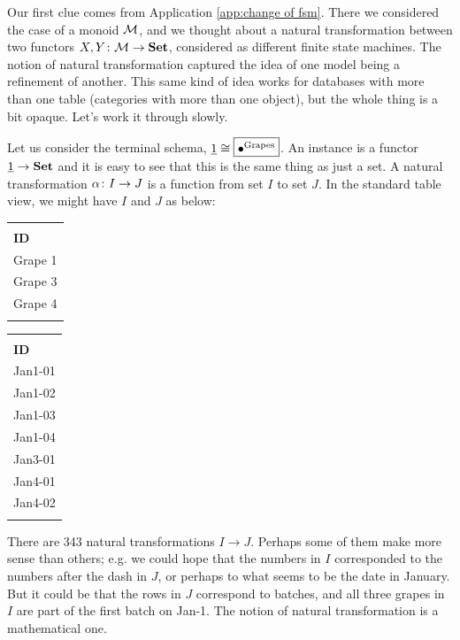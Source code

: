 \documentclass[CT4S-EN-RU]{subfiles}
\begin{document}
Our first clue comes from Application \ref{app:change of fsm}. There we considered the case of a monoid $\mathcal{M}$, and we thought about a natural transformation between two functors $X,Y\colon\mathcal{M}\rightarrow{\bf Set}$, considered as different finite state machines. The notion of natural transformation captured the idea of one model being a refinement of another. This same kind of idea works for databases with more than one table (categories with more than one object), but the whole thing is a bit opaque. Let's work it through slowly.

\begin{example}\label{ex:nts on term}
Let us consider the terminal schema, $\underline{1}\cong\fbox{$\bullet^{\textnormal{Grapes}}$}$. An instance is a functor $\underline{1}\rightarrow{\bf Set}$ and it is easy to see that this is the same thing as just a set. A natural transformation $\alpha\colon I\rightarrow J$ is a function from set $I$ to set $J$. In the standard table view, we might have $I$ and $J$ as below:
\begin{center}
\begin{tabular}{| l ||}\bhline
\multicolumn{1}{| c |}{Grapes $(I)$}\\\bhline
{\bf ID}\\\bbhline
Grape 1\\\hline
Grape 3\\\hline
Grape 4\\\bhline
\end{tabular}
\hspace{1in}
\begin{tabular}{| l ||}\bhline
\multicolumn{1}{| c |}{Grapes $(J)$}\\\bhline
{\bf ID}\\\bbhline
Jan1-01\\\hline
Jan1-02\\\hline
Jan1-03\\\hline
Jan1-04\\\hline
Jan3-01\\\hline
Jan4-01\\\hline
Jan4-02\\\bhline
\end{tabular}
\end{center}

There are 343 natural transformations $I\to J$. Perhaps some of them make more sense than others; e.g. we could hope that the numbers in $I$ corresponded to the numbers after the dash in $J$, or perhaps to what seems to be the date in January. But it could be that the rows in $J$ correspond to batches, and all three grapes in $I$ are part of the first batch on Jan-1. The notion of natural transformation is a mathematical one.
\end{example}
\end{document}

